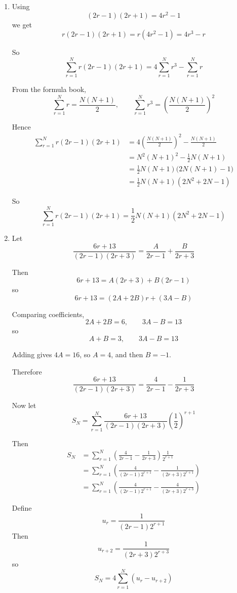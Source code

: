 \documentclass[leqno]{article}
\begin{document}
\begin{enumerate}[
  label=\textbf{\arabic*.},
  leftmargin=*,
  topsep=0pt,
  partopsep=0pt,
  parsep=0pt
]
\vspace*{10pt}

\begin{tcolorbox}[colback=white, colframe=scarlet, title={\textbf{Solution}}, breakable, grow to left by=6mm, grow to right by=10mm]
\begin{enumerate}[label=\textbf{(\alph*)}]
  \item Using
\[
(2r-1)(2r+1)=4r^2-1
\]
we get
\[
r(2r-1)(2r+1)=r(4r^2-1)=4r^3-r
\]

So
\[
\sum_{r=1}^{N} r(2r-1)(2r+1)=4\sum_{r=1}^{N} r^3-\sum_{r=1}^{N} r
\]

From the formula book,
\[
\sum_{r=1}^{N} r=\frac{N(N+1)}{2},
\qquad
\sum_{r=1}^{N} r^3=\left(\frac{N(N+1)}{2}\right)^2
\]

Hence
\begin{align*}
\sum_{r=1}^{N} r(2r-1)(2r+1)
&=4\left(\frac{N(N+1)}{2}\right)^2-\frac{N(N+1)}{2} \\
&=N^2(N+1)^2-\frac12 N(N+1) \\
&=\frac12 N(N+1)\bigl(2N(N+1)-1\bigr) \\
&=\frac12 N(N+1)(2N^2+2N-1)
\end{align*}

So
\[
\sum_{r=1}^{N} r(2r-1)(2r+1)=\frac12 N(N+1)(2N^2+2N-1)
\]

  \item Let
\[
\frac{6r+13}{(2r-1)(2r+3)}=\frac{A}{2r-1}+\frac{B}{2r+3}
\]

Then
\[
6r+13=A(2r+3)+B(2r-1)
\]
so
\[
6r+13=(2A+2B)r+(3A-B)
\]

Comparing coefficients,
\[
2A+2B=6,\qquad 3A-B=13
\]
so
\[
A+B=3,\qquad 3A-B=13
\]

Adding gives \(4A=16\), so \(A=4\), and then \(B=-1\).

Therefore
\[
\frac{6r+13}{(2r-1)(2r+3)}=\frac{4}{2r-1}-\frac{1}{2r+3}
\]

Now let
\[
S_N=\sum_{r=1}^{N} \frac{6r+13}{(2r-1)(2r+3)}\left(\frac12\right)^{r+1}
\]

Then
\begin{align*}
S_N
&=\sum_{r=1}^{N}\left(\frac{4}{2r-1}-\frac{1}{2r+3}\right)\frac{1}{2^{r+1}} \\
&=\sum_{r=1}^{N}\left(\frac{4}{(2r-1)2^{r+1}}-\frac{1}{(2r+3)2^{r+1}}\right) \\
&=\sum_{r=1}^{N}\left(\frac{4}{(2r-1)2^{r+1}}-\frac{4}{(2r+3)2^{r+3}}\right)
\end{align*}

Define
\[
u_r=\frac{1}{(2r-1)2^{r+1}}
\]
Then
\[
u_{r+2}=\frac{1}{(2r+3)2^{r+3}}
\]
so
\[
S_N=4\sum_{r=1}^{N}(u_r-u_{r+2})
\]


\end{enumerate}
\end{tcolorbox}
\end{enumerate}
\end{document}
